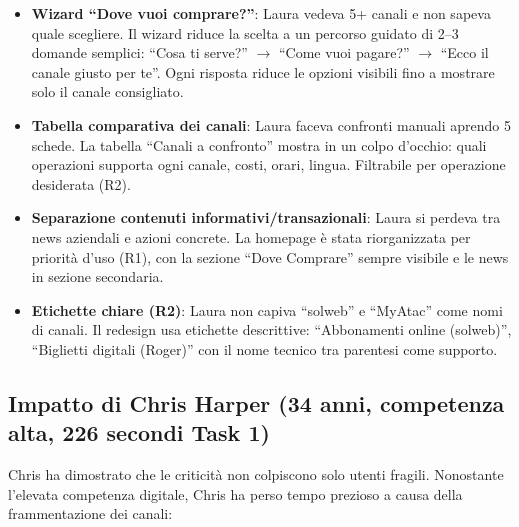 \documentclass[11pt,a4paper]{article}
\begin{document}
\begin{itemize}
    \item \textbf{Wizard ``Dove vuoi comprare?''}: Laura vedeva 5+ canali e non sapeva quale scegliere. Il wizard riduce la scelta a un percorso guidato di 2--3 domande semplici: ``Cosa ti serve?'' $\rightarrow$ ``Come vuoi pagare?'' $\rightarrow$ ``Ecco il canale giusto per te''. Ogni risposta riduce le opzioni visibili fino a mostrare solo il canale consigliato.
    \item \textbf{Tabella comparativa dei canali}: Laura faceva confronti manuali aprendo 5 schede. La tabella ``Canali a confronto'' mostra in un colpo d'occhio: quali operazioni supporta ogni canale, costi, orari, lingua. Filtrabile per operazione desiderata (R2).
    \item \textbf{Separazione contenuti informativi/transazionali}: Laura si perdeva tra news aziendali e azioni concrete. La homepage \`e stata riorganizzata per priorit\`a d'uso (R1), con la sezione ``Dove Comprare'' sempre visibile e le news in sezione secondaria.
    \item \textbf{Etichette chiare (R2)}: Laura non capiva ``solweb'' e ``MyAtac'' come nomi di canali. Il redesign usa etichette descrittive: ``Abbonamenti online (solweb)'', ``Biglietti digitali (Roger)'' con il nome tecnico tra parentesi come supporto.
\end{itemize}

\subsection{Impatto di Chris Harper (34 anni, competenza alta, 226 secondi Task 1)}

Chris ha dimostrato che le criticit\`a non colpiscono solo utenti fragili. Nonostante l'elevata competenza digitale, Chris ha perso tempo prezioso a causa della frammentazione dei canali:
\end{document}
